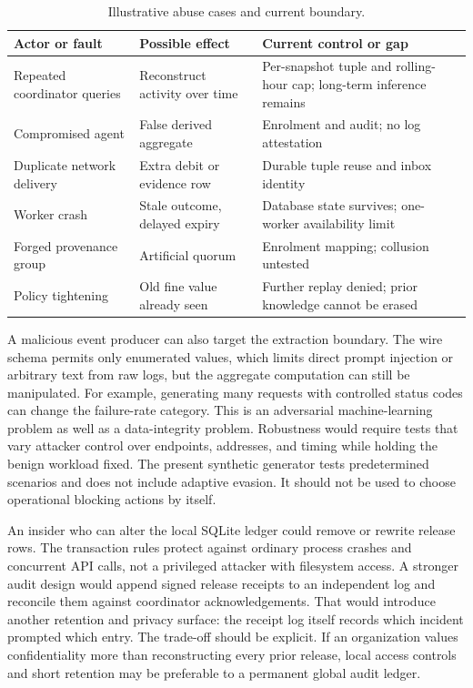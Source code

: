 \documentclass[conference,letterpaper]{IEEEtran}
\begin{document}
\begin{table}[t]
\centering\caption{Illustrative abuse cases and current boundary.}
\label{tab:abuse}\scriptsize\setlength{\tabcolsep}{2pt}
\begin{tabular}{p{}p{}p{}}\hline
Actor or fault & Possible effect & Current control or gap \\\hline
Repeated coordinator queries & Reconstruct activity over time & Per-snapshot tuple and rolling-hour cap; long-term inference remains\\
Compromised agent & False derived aggregate & Enrolment and audit; no log attestation\\
Duplicate network delivery & Extra debit or evidence row & Durable tuple reuse and inbox identity\\
Worker crash & Stale outcome, delayed expiry & Database state survives; one-worker availability limit\\
Forged provenance group & Artificial quorum & Enrolment mapping; collusion untested\\
Policy tightening & Old fine value already seen & Further replay denied; prior knowledge cannot be erased\\\hline
\end{tabular}
\end{table}

A malicious event producer can also target the extraction boundary. The wire schema permits only enumerated values, which limits direct prompt injection or arbitrary text from raw logs, but the aggregate computation can still be manipulated. For example, generating many requests with controlled status codes can change the failure-rate category. This is an adversarial machine-learning problem as well as a data-integrity problem. Robustness would require tests that vary attacker control over endpoints, addresses, and timing while holding the benign workload fixed. The present synthetic generator tests predetermined scenarios and does not include adaptive evasion. It should not be used to choose operational blocking actions by itself.

An insider who can alter the local SQLite ledger could remove or rewrite release rows. The transaction rules protect against ordinary process crashes and concurrent API calls, not a privileged attacker with filesystem access. A stronger audit design would append signed release receipts to an independent log and reconcile them against coordinator acknowledgements. That would introduce another retention and privacy surface: the receipt log itself records which incident prompted which entry. The trade-off should be explicit. If an organization values confidentiality more than reconstructing every prior release, local access controls and short retention may be preferable to a permanent global audit ledger.
\end{document}
